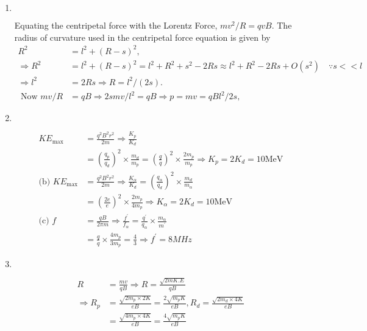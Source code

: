 \begin{enumerate}
\item $\left. \right. $
\begin{answer}
	 Equating the centripetal force with the Lorentz Force, $m v^{2} / R=q v B$.
	The radius of curvature used in the centripetal force equation is given by
	\begin{align*}
 R^{2}&=l^{2}+(R-s)^{2},\\
	\Rightarrow R^{2}&=l^{2}+(R-s)^{2}=l^{2}+R^{2}+s^{2}-2 R s \approx l^{2}+R^{2}-2 R s+O\left(s^{2}\right) \quad \because s<<l\\
	\Rightarrow l^{2}&=2 R s \Rightarrow R=l^{2} /(2 s) .\\
\text{	Now }m v / R&=q B \Rightarrow 2 s m v / l^{2}=q B \Rightarrow p=m v=q B l^{2} / 2 s,
	\end{align*}
\end{answer}
\item $\left. \right. $
\begin{answer}
	\begin{align*}
K E_{\max }&=\frac{q^{2} B^{2} r^{2}}{2 m} \Rightarrow \frac{K_{p}}{K_{d}}\\&=\left(\frac{q_{p}}{q_{d}}\right)^{2} \times \frac{m_{d}}{m_{p}}=\left(\frac{q}{q}\right)^{2} \times \frac{2 m_{p}}{m_{p}} \Rightarrow K_{p}=2 K_{d}=10 \mathrm{MeV}\\
	\text{(b) }K E_{\max }&=\frac{q^{2} B^{2} r^{2}}{2 m} \Rightarrow \frac{K_{\alpha}}{K_{d}}=\left(\frac{q_{\alpha}}{q_{d}}\right)^{2} \times \frac{m_{d}}{m_{\alpha}}\\&=\left(\frac{2 e}{e}\right)^{2} \times \frac{2 m_{p}}{4 m_{p}} \Rightarrow K_{\alpha}=2 K_{d}=10 \mathrm{MeV}\\
	\text{(c) }f&=\frac{q B}{2 \pi m} \Rightarrow \frac{f^{\prime}}{f_{\alpha}}=\frac{q^{\prime}}{q_{\alpha}} \times \frac{m_{\alpha}}{m^{\prime}}\\&=\frac{q}{q} \times \frac{4 m_{p}}{3 m_{p}}=\frac{4}{3} \Rightarrow f^{\prime}=8 M H z
	\end{align*}
\end{answer}
\item $\left. \right. $
\begin{answer}
	\begin{align*}
R&=\frac{m v}{q B} \Rightarrow R=\frac{\sqrt{2 m K . E}}{q B}\\
	\Rightarrow R_{p}&=\frac{\sqrt{2 m_{p} \times 2 K}}{e B}=\frac{2 \sqrt{m_{p} K}}{e B}, R_{d}=\frac{\sqrt{2 m_{d} \times 4 K}}{e B}\\&=\frac{\sqrt{4 m_{p} \times 4 K}}{e B}=\frac{4 \sqrt{m_{p} K}}{e B} \\

\end{align*}
\end{answer}
\end{enumerate}
